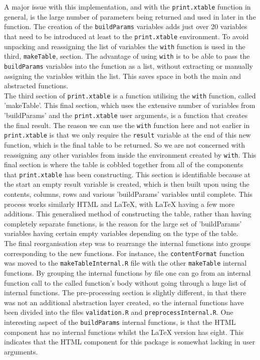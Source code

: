 \documentclass{memoir}\usepackage[]{graphicx}\usepackage[]{color}
\let\code=\texttt
\newcommand{\latex}{\LaTeX\xspace}
\begin{document}
A major issue with this implementation, and with the \code{print.xtable} function in general, is the large number of parameters being returned and used in later in the function. The creation of the \code{buildParams} variables adds just over 20 variables that need to be introduced at least to the \code{print.xtable} environment. To avoid unpacking and reassigning the list of variables the \code{with} function is used in the third, \code{makeTable}, section. The advantage of using \code{with} is to be able to pass the \code{buildParams} variables into the function as a list, without extracting or manually assigning the variables within the list. This saves space in both the main and abstracted functions.\\

The third section of \code{print.xtable} is a function utilising the \code{with} function, called 'makeTable'. This final section, which uses the extensive number of variables from 'buildParams' and the \code{print.xtable} user arguments, is a function that creates the final result. The reason we can use the \code{with} function here and not earlier in \code{print.xtable} is that we only require the \code{result} variable at the end of this new function, which is the final table to be returned. So we are not concerned with reassigning any other variables from inside the environment created by \code{with}. This final section is where the table is cobbled together from all of the components that \code{print.xtable} has been constructing. This section is identifiable because at the start an empty result variable is created, which is then built upon using the contents, columns, rows and various 'buildParams' variables until complete. This process works similarly HTML and \latex, with \latex having a few more additions. This generalised method of constructing the table, rather than having completely separate functions, is the reason for the large set of 'buildParams' variables having certain empty variables depending on the type of the table.\\

The final reorganisation step was to rearrange the internal functions into groups corresponding to the new functions. For instance, the \code{contentFormat} function was moved to the \code{makeTableInternal.R} file with the other \code{makeTable} internal functions. By grouping the internal functions by file one can go from an internal function call to the called function's body without going through a huge list of internal functions. The pre-processing section is slightly different, in that there was not an additional abstraction layer created, so the internal functions have been divided into the files \code{validation.R} and \code{preprocessInternal.R}. One interesting aspect of the \code{buildParams} internal functions, is that the HTML component has no internal functions whilst the \latex version has eight. This indicates that the HTML component for this package is somewhat lacking in user arguments.
\end{document}
